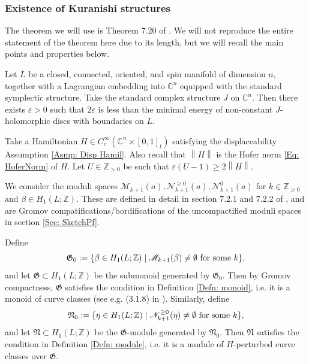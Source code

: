 \documentclass[10pt]{amsart}
\numberwithin{equation}{section}
\theoremstyle{plain}
\theoremstyle{definition}
\theoremstyle{remark}
\numberwithin{equation}{section}
\newcommand{\Z}{\mathbb{Z}}
\newcommand{\C}{\mathbb{C}}
\newcommand{\ms}[1]{\mathscr{#1}}
\newcommand{\norm}[1]{\left\lVert{#1}\right\rVert}
\begin{document}
{\subsubsection{Existence of Kuranishi structures}
\label{Subsc: Kuranishi}

The theorem we will use is Theorem 7.20 of \cite{Irie2}. We will not reproduce the entire statement of the theorem here due to its length, but we will recall the main points and properties below.

Let $L$ be a closed, connected, oriented, and spin manifold of dimension $n$, together with a Lagrangian embedding into $\C^n$ equipped with the standard symplectic structure.
Take the standard complex structure $J$ on $\C^n$.
Then there exists $\varepsilon>0$ such that $2\varepsilon$ is less than the minimal energy of non-constant $J$-holomorphic discs with boundaries on $L$.

Take a Hamiltonian $H\in C^\infty_c(\C^n \times [0,1]_t)$ satisfying the displaceability Assumption \ref{Asmp: Disp Hamil}.
Also recall that $\norm{H}$ is the Hofer norm \eqref{Eq: HoferNorm} of $H$.
Let $U\in \Z_{> 0}$ be such that $\varepsilon(U-1) \geq 2\norm{H}$.





We consider the moduli spaces $\ms{M}_{k+1}(a), \ms{N}^{\geq 0}_{k+1}(a), \ms{N}^{0}_{k+1}(a)$	 for $k\in \Z_{\geq 0}$ and $\beta \in H_1(L;\Z)$. These are defined in detail in section 7.2.1 and 7.2.2 of \cite{Irie2}, and are Gromov compatifications/bordifications of the uncompactified moduli spaces in section \ref{Sec: SketchPf}.




Define \[ \mathfrak{G}_0:= \{ \beta \in H_1(L;\Z)\mid \ms{M}_{k+1}(\beta) \neq \emptyset \textup{ for some }k\}, \] and let  $\mathfrak{G}\subset H_1(L;\Z)$ be the submonoid generated by $\mathfrak{G}_0$. Then by Gromov compactness, $\mathfrak{G}$ satisfies the condition in Definition \ref{Defn: monoid}, i.e. it is a monoid of curve classes (see e.g. (3.1.8) in \cite{FOOO1}).
Similarly, define 
\[
\mathfrak{N}_0:= \{\eta\in H_1(L;\Z) \mid \ms{N}^{\geq 0}_{k+1}(\eta)\neq \emptyset\textup{ for some }k\},
\]
and let $\mathfrak{N}\subset H_1(L;\Z)$ be the $\mathfrak{G}$-module generated by $\mathfrak{N}_0$. Then $\mathfrak{N}$ satisfies the condition in Definition \ref{Defn: module}, i.e. it is a module of $H$-perturbed curve classes over $\mathfrak{G}$.






}
\end{document}

